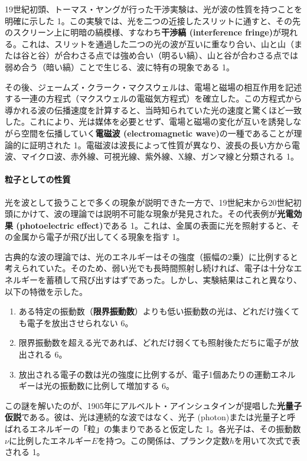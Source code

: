 \documentclass[11pt,a4paper]{ltjsarticle}
\begin{document}
19世紀初頭、トーマス・ヤングが行った干渉実験は、光が波の性質を持つことを明確に示した 1。この実験では、光を二つの近接したスリットに通すと、その先のスクリーン上に明暗の縞模様、すなわち\textbf{干渉縞 (interference fringe)}が現れる。これは、スリットを通過した二つの光の波が互いに重なり合い、山と山（または谷と谷）が合わさる点では強め合い（明るい縞）、山と谷が合わさる点では弱め合う（暗い縞）ことで生じる、波に特有の現象である 1。

その後、ジェームズ・クラーク・マクスウェルは、電場と磁場の相互作用を記述する一連の方程式（マクスウェルの電磁気方程式）を確立した。この方程式から導かれる波の伝播速度を計算すると、当時知られていた光の速度と驚くほど一致した。これにより、光は媒体を必要とせず、電場と磁場の変化が互いを誘発しながら空間を伝播していく\textbf{電磁波 (electromagnetic wave)}の一種であることが理論的に証明された 1。電磁波は波長によって性質が異なり、波長の長い方から電波、マイクロ波、赤外線、可視光線、紫外線、X線、ガンマ線と分類される 1。

\paragraph{粒子としての性質}

光を波として扱うことで多くの現象が説明できた一方で、19世紀末から20世紀初頭にかけて、波の理論では説明不可能な現象が発見された。その代表例が\textbf{光電効果 (photoelectric effect)}である 1。これは、金属の表面に光を照射すると、その金属から電子が飛び出してくる現象を指す 1。

古典的な波の理論では、光のエネルギーはその強度（振幅の2乗）に比例すると考えられていた。そのため、弱い光でも長時間照射し続ければ、電子は十分なエネルギーを蓄積して飛び出すはずであった。しかし、実験結果はこれと異なり、以下の特徴を示した。

\begin{enumerate}
\item ある特定の振動数（\textbf{限界振動数}）よりも低い振動数の光は、どれだけ強くても電子を放出させられない 6。
\item 限界振動数を超える光であれば、どれだけ弱くても照射後ただちに電子が放出される 6。
\item 放出される電子の数は光の強度に比例するが、電子1個あたりの運動エネルギーは光の振動数に比例して増加する 6。
\end{enumerate}

この謎を解いたのが、1905年にアルベルト・アインシュタインが提唱した\textbf{光量子仮説}である。彼は、光は連続的な波ではなく、光子 (photon)または光量子と呼ばれるエネルギーの「粒」の集まりであると仮定した 1。各光子は、その振動数$\nu$に比例したエネルギー$E$を持つ。この関係は、プランク定数$h$を用いて次式で表される 1。
\end{document}
